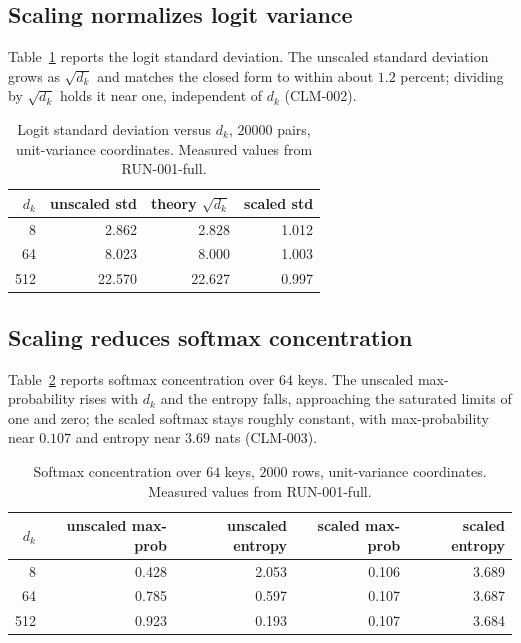 \documentclass{article}
\begin{document}
\subsection{Scaling normalizes logit variance}

Table~\ref{tab:logit-std} reports the logit standard deviation. The unscaled
standard deviation grows as $\sqrt{d_k}$ and matches the closed form to within
about $1.2$ percent; dividing by $\sqrt{d_k}$ holds it near one, independent of
$d_k$ (CLM-002).

\begin{table}[h]
\centering
\caption{Logit standard deviation versus $d_k$, $20000$ pairs, unit-variance
coordinates. Measured values from RUN-001-full.}
\label{tab:logit-std}
\begin{tabular}{r r r r}
\toprule
$d_k$ & unscaled std & theory $\sqrt{d_k}$ & scaled std \\
\midrule
8 & 2.862 & 2.828 & 1.012 \\
64 & 8.023 & 8.000 & 1.003 \\
512 & 22.570 & 22.627 & 0.997 \\
\bottomrule
\end{tabular}
\end{table}

\subsection{Scaling reduces softmax concentration}

Table~\ref{tab:concentration} reports softmax concentration over $64$ keys. The
unscaled max-probability rises with $d_k$ and the entropy falls, approaching
the saturated limits of one and zero; the scaled softmax stays roughly
constant, with max-probability near $0.107$ and entropy near $3.69$ nats
(CLM-003).

\begin{table}[h]
\centering
\caption{Softmax concentration over $64$ keys, $2000$ rows, unit-variance
coordinates. Measured values from RUN-001-full.}
\label{tab:concentration}
\begin{tabular}{r r r r r}
\toprule
$d_k$ & unscaled max-prob & unscaled entropy & scaled max-prob & scaled entropy \\
\midrule
8 & 0.428 & 2.053 & 0.106 & 3.689 \\
64 & 0.785 & 0.597 & 0.107 & 3.687 \\
512 & 0.923 & 0.193 & 0.107 & 3.684 \\
\bottomrule
\end{tabular}
\end{table}
\end{document}
